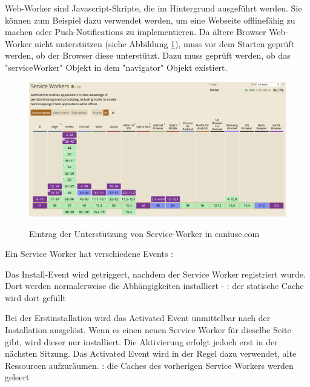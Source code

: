 

Web-Worker sind Javascript-Skripte, die im Hintergrund ausgeführt werden. 
Sie können zum Beispiel dazu verwendet werden, um eine Webseite offlinefähig zu machen oder Push-Notifications zu implementieren.
Da ältere Browser Web-Worker nicht unterstützen (siehe Abbildung \ref{fig:CanIUseServiceWorker}), muss vor dem Starten geprüft werden, ob der Browser diese unterstützt. 
Dazu muss geprüft werden, ob das "serviceWorker" Objekt in dem "navigator" Objekt existiert. 

\begin{figure}[H]
    \centering
    \includegraphics[width=\textwidth]{media/ServiceWorker/CanIUseServiceWorker.png}
    \caption{Eintrag der Unterstützung von Service-Worker in caniuse.com}
    \cite{ciuServiceWorker}
    \label{fig:CanIUseServiceWorker}
\end{figure}


Ein Service Worker hat verschiedene Events \cite{MDNCacheAPI}: 


Das Install-Event wird getriggert, nachdem der Service Worker registriert wurde. Dort werden normalerweise die Abhängigkeiten installiert - \zb: der statische Cache wird dort gefüllt 


Bei der Erstinstallation wird das Activated Event unmittelbar nach der Installation ausgelöst. Wenn es einen neuen Service Worker für dieselbe Seite gibt, wird dieser nur installiert. Die Aktivierung erfolgt jedoch erst in der nächsten Sitzung. Das Activated Event wird in der Regel dazu verwendet, alte Ressourcen aufzuräumen. \zb: die Caches des vorherigen Service Workers werden geleert

